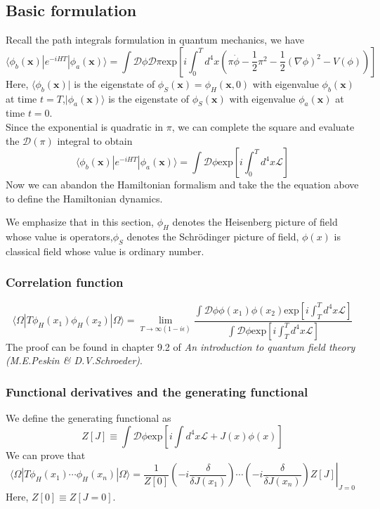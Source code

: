 \documentclass[cyan]{elegantnote}
\begin{document}
\subsection{Basic formulation}
\noindent
Recall the path integrals formulation in quantum mechanics, we have
\[\langle \phi_b(\bm{x}) | e^{-iHT} | \phi_a(\bm{x}) \rangle = \int \mathcal{D}\phi \mathcal{D}\pi  \mathrm{exp} \left[ i\int_0^T d^4x (\pi\dot{\phi} - \frac{1}{2}\pi^2 - \frac{1}{2}(\nabla \phi)^2 -V(\phi))\right]\]
Here, $\langle \phi_b(\bm{x}) |$ is the eigenstate of $\phi_S(\bm{x})=\phi_H(\bm{x},0)$ with eigenvalue $\phi_b(\bm{x})$ at time $t=T$,$| \phi_a(\bm{x}) \rangle$ is the eigenstate of $\phi_S(\bm{x})$ with eigenvalue $\phi_a(\bm{x})$ at time $t=0$.\\
Since the exponential is quadratic in $\pi$, we can complete the square and evaluate the $\mathcal{D}(\pi)$ integral to obtain
\[\langle \phi_b(\bm{x}) | e^{-iHT} | \phi_a(\bm{x}) \rangle = \int \mathcal{D}\phi  \mathrm{exp} \left[ i\int_0^T d^4x \mathcal{L} \right]\]
Now we can abandon the Hamiltonian formalism and take the the equation above to define the Hamiltonian dynamics.
\begin{note}
We emphasize that in this section, $\phi_H$ denotes the Heisenberg picture of field whose value is operators,$\phi_S$ denotes the Schr\"{o}dinger picture of field, $\phi(x)$ is classical field whose value is ordinary number.
\end{note}

\subsubsection{Correlation function}
\[\langle \Omega | T \phi_H(x_1) \phi_H(x_2)| \Omega \rangle = \lim_{T \to \infty(1-i\epsilon)} \frac{\int \mathcal{D}\phi \phi(x_1)\phi(x_2) \mathrm{exp} \left[ i\int_T^T d^4x \mathcal{L} \right]}{\int \mathcal{D} \phi \mathrm{exp} \left[ i\int_T^T d^4x \mathcal{L} \right]}\]
The proof can be found in chapter 9.2 of \emph{An introduction to quantum field theory (M.E.Peskin \& D.V.Schroeder)}.

\subsubsection{Functional derivatives and the generating functional}
\noindent
We define the generating functional as
\[Z[J] \equiv \int \mathcal{D} \phi \mathrm{exp} \left[ i\int d^4x \mathcal{L} + J(x)\phi(x) \right]\]
We can prove that
\[\langle \Omega | T \phi_H(x_1) \cdots \phi_H(x_n) | \Omega \rangle = \frac{1}{Z[0]} \left. \left( -i\frac{\delta}{\delta J(x_1)} \right)\cdots \left( -i\frac{\delta}{\delta J(x_n)} \right) Z[J]\right|_{J=0}\]
Here, $Z[0] \equiv Z[J=0]$.
\end{document}
